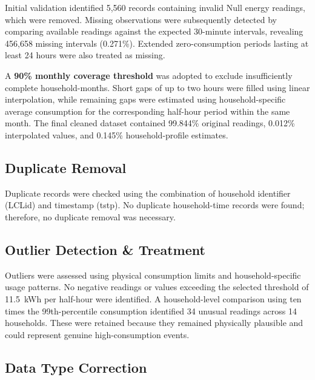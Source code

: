\documentclass[11pt,letterpaper]{article}
\begin{document}
Initial validation identified 5,560 records containing invalid Null
energy readings, which were removed. Missing observations were
subsequently detected by comparing available readings against the
expected 30-minute intervals, revealing 456,658 missing intervals
(0.271\%). Extended zero-consumption periods lasting at least 24 hours
were also treated as missing.

A \textbf{90\% monthly coverage threshold} was adopted to exclude
insufficiently complete household-months. Short gaps of up to two hours
were filled using linear interpolation, while remaining gaps were
estimated using household-specific average consumption for the
corresponding half-hour period within the same month. The final cleaned
dataset contained 99.844\% original readings, 0.012\% interpolated values,
and 0.145\% household-profile estimates.

\subsection{Duplicate Removal}
\label{sec:duplicates}

Duplicate records were checked using the combination of household
identifier (LCLid) and timestamp (tstp). No duplicate household-time
records were found; therefore, no duplicate removal was necessary.

\subsection{Outlier Detection \& Treatment}
\label{sec:outliers}

Outliers were assessed using physical consumption limits and
household-specific usage patterns. No negative readings or values
exceeding the selected threshold of 11.5~kWh per half-hour were
identified. A household-level comparison using ten times the
99th-percentile consumption identified 34 unusual readings across 14
households. These were retained because they remained physically
plausible and could represent genuine high-consumption events.

\subsection{Data Type Correction}
\label{sec:types}
\end{document}
